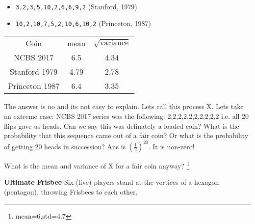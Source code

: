 \documentclass[a4paper,8pt,addpoints,solution]{exam}
\begin{document}
\begin{questions}
\begin{itemize}
    \item \verb|3,2,3,5,10,2,6,6,9,2|     (Stanford, 1979)
    \item \verb|10,2,10,7,5,2,10,6,10,2|  (Princeton, 1987)
\end{itemize}


\begin{solution}
\begin{tabular}{c c  c}
 Coin         & mean & $\sqrt{\text{variance}}$ \\
NCBS 2017     & 6.5  & 4.34  \\
Stanford 1979 & 4.79 & 2.78  \\
Princeton 1987& 6.4  & 3.35  \\
\end{tabular}

The answer is no and its not easy to explain.
Lets call this process X. Lets take an extreme case: NCBS 2017 series was the
following: 2,2,2,2,2,2,2,2,2,2 i.e. all 20 flips gave us heads. Can we say this
was definately a loaded coin? What is the probability that this sequence came
out of a fair coin? Or what is the probability of getting 20 heads in
succession? Ans is $(\frac{1}{2})^{20}$. It is non-zero!

What is the mean and variance of X for a fair coin anyway?  \footnote{mean=6,std=4.7}
\end{solution} 

\question[10] \textbf{Ultimate Frisbee} 
Six (five) players stand at the vertices of a hexagon (pentagon), throwing
Frisbees to each other.

\end{questions}
\end{document}
